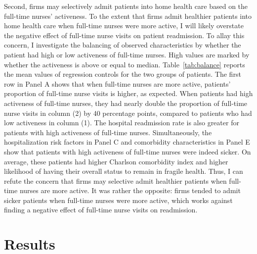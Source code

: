 \documentclass[final,12pt]{article}
\begin{document}
Second, firms may selectively admit patients into home health care based on the full-time nurses' activeness.
To the extent that firms admit healthier patients into home health care when full-time nurses were more active, I will likely overstate the negative effect of full-time nurse visits on patient readmission.
To allay this concern, I investigate the balancing of observed characteristics by whether the patient had high or low activeness of full-time nurses.  High values are marked by whether the activeness is above or equal to median.
Table~\ref{tab:balance} reports the mean values of regression controls for the two groups of patients.
The first row in Panel A shows that when full-time nurses are more active, patients' proportion of full-time nurse visits is higher, as expected.
When patients had high activeness of full-time nurses, they had nearly double the proportion of full-time nurse visits in column (2) by 40 percentage points, compared to patients who had low activeness in column (1).
The hospital readmission rate is also greater for patients with high activeness of full-time nurses.
Simultaneously, the hospitalization risk factors in Panel C and comorbidity characteristics in Panel E show that patients with high activeness of full-time nurses were indeed sicker.
On average, these patients had higher Charlson comorbidity index and higher likelihood of having their overall status to remain in fragile health.
Thus, I can refute the concern that firms may selective admit healthier patients when full-time nurses are more active.
It was rather the opposite: firms tended to admit sicker patients when full-time nurses were more active, which works against finding a negative effect of full-time nurse visits on readmission.



\section{Results} \label{sec:results_ch1}

\end{document}
